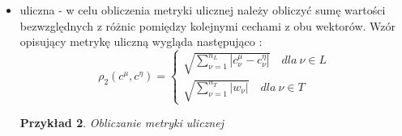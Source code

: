 \documentclass{classrep}
\newtheorem{exmp}{Przykład}[section]
\begin{document}
\begin{itemize}
\begin{exmp}
\begin{equation}
        \end{equation} \\
    \end{exmp}
    \item uliczna - w celu obliczenia metryki ulicznej należy obliczyć sumę wartości bezwzględnych z różnic pomiędzy kolejnymi cechami z obu wektorów. Wzór opisujący metrykę uliczną wygląda następująco \cite{tadeusiewicz90}:
    \begin{equation}
    \label{eqn:uliczna}
        \rho_2(c^\mu, c^\eta)= \left\{\begin{matrix} \sqrt{\sum_{\nu=1}^{n_L}\left | c_{\nu}^\mu - c_{\nu}^\eta \right |} \quad dla \: \nu \in L \\ \sqrt{\sum_{\nu=1}^{n_T} \left | w_{\nu} \right |} \quad dla \: \nu \in T \end{matrix}\right.
    \end{equation}
    \begin{exmp} Obliczanie metryki ulicznej  
    

\end{exmp}
\end{itemize}
\end{document}
